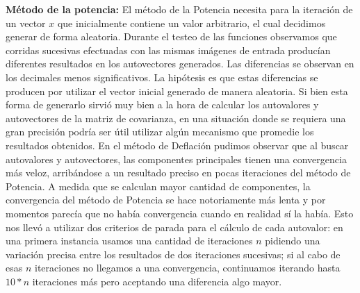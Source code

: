\textbf{Método de la potencia:} El método de la Potencia necesita para la iteración de un vector $x$ que inicialmente contiene un valor arbitrario, el cual decidimos generar de forma aleatoria. Durante el testeo de las funciones observamos que corridas sucesivas efectuadas con las mismas imágenes de entrada producían diferentes resultados en los autovectores generados. Las diferencias se observan en los decimales menos significativos. La hipótesis es que estas diferencias se producen por utilizar el vector inicial generado de manera aleatoria. Si bien esta forma de generarlo sirvió muy bien a la hora de calcular los autovalores y autovectores de la matriz de covarianza, en una situación donde se requiera una gran precisión podría ser útil utilizar algún mecanismo que promedie los resultados obtenidos.
En el método de Deflación pudimos observar que al buscar autovalores y autovectores, las componentes principales tienen una convergencia más veloz, arribándose a un resultado preciso en pocas iteraciones del método de Potencia. A medida que se calculan mayor cantidad de componentes, la convergencia del método de Potencia se hace notoriamente más lenta y por momentos parecía que no había convergencia cuando en realidad sí la había. Esto nos llevó a utilizar dos criterios de parada para el cálculo de cada autovalor: en una primera instancia usamos una cantidad de iteraciones $n$ pidiendo una variación precisa entre los resultados de dos iteraciones sucesivas; si al cabo de esas $n$ iteraciones no llegamos a una convergencia, continuamos iterando hasta $10*n$ iteraciones más pero aceptando una diferencia algo mayor.


